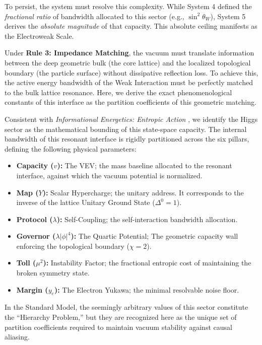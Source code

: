 To persist, the system must resolve this complexity. While System 4 defined the \textit{fractional ratio} of bandwidth allocated to this sector (e.g., $\sin^2\theta_W$), System 5 derives the \textit{absolute magnitude} of that capacity. This absolute ceiling manifests as the Electroweak Scale.

Under \textbf{Rule 3: Impedance Matching}, the vacuum must translate information between the deep geometric bulk (the core lattice) and the localized topological boundary (the particle surface) without dissipative reflection loss. To achieve this, the active energy bandwidth of the Weak Interaction must be perfectly matched to the bulk lattice resonance. Here, we derive the exact phenomenological constants of this interface as the partition coefficients of this geometric matching.

Consistent with \textit{Informational Energetics: Entropic Action} \cite{meyer_ieaction_2026}, we identify the Higgs sector as the mathematical bounding of this state-space capacity. The internal bandwidth of this resonant interface is rigidly partitioned across the six pillars, defining the following physical parameters:

\begin{itemize}
    \item \textbf{Capacity ($v$):} The VEV; the mass baseline allocated to the resonant interface, against which the vacuum potential is normalized.
    \item \textbf{Map ($Y$):} Scalar Hypercharge; the unitary address. It corresponds to the inverse of the lattice Unitary Ground State ($\Delta^0=1$).
    \item \textbf{Protocol ($\lambda$):} Self-Coupling; the self-interaction bandwidth allocation.
    \item \textbf{Governor ($\lambda|\phi|^4$):} The Quartic Potential; The geometric capacity wall enforcing the topological boundary ($\chi=2$).
    \item \textbf{Toll ($\mu^2$):} Instability Factor; the fractional entropic cost of maintaining the broken symmetry state.
    \item \textbf{Margin ($y_e$):} The Electron Yukawa; the minimal resolvable noise floor.
\end{itemize}

In the Standard Model, the seemingly arbitrary values of this sector constitute the ``Hierarchy Problem,'' but they are recognized here as the unique set of partition coefficients required to maintain vacuum stability against causal aliasing.

